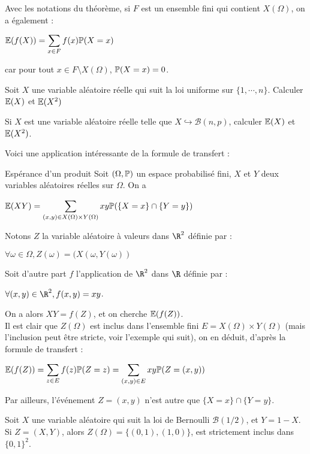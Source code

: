 \documentclass[12pt,a4paper]{report}
\begin{document}
\begin{remarque}{}
Avec les notations du théorème, si $F$ est un ensemble fini qui contient $X(\Omega)$, on a également :
\begin{center}
$\mathbb{E}(f(X)) = \displaystyle \sum_{x \in F} f(x) \mathbb{P}(X=x)$
\end{center}
car pour tout $x \in F \setminus X(\Omega)$, $\mathbb{P}(X=x) = 0$.
\end{remarque}

\begin{exemple}[Exercice 13]{}
Soit $X$ une variable aléatoire réelle qui suit la loi uniforme sur $\{1,\cdots,n\}$. Calculer $\mathbb{E}(X)$ et $\mathbb{E}(X^2)$
\end{exemple}

\begin{exemple}[Exercice 14]{}
Si $X$ est une variable aléatoire réelle telle que $X \hookrightarrow \mathcal{B}(n,p)$, calculer $\mathbb{E}(X)$ et $\mathbb{E}(X^2)$.
\end{exemple}

Voici une application intéressante de la formule de transfert :
\begin{proposition}{Espérance d'un produit}{}
Soit $(\Omega, \mathbb{P})$ un espace probabilisé fini, $X$ et $Y$ deux variables aléatoires réelles sur $\Omega$. On a
\begin{center}
$\mathbb{E}(XY) = \displaystyle \sum_{(x,y) \in X(\Omega) \times Y(\Omega)} xy \mathbb{P}(\{X = x\} \cap \{Y = y\})$
\end{center}
\end{proposition}

\begin{demo}{}
Notons $Z$ la variable aléatoire à valeurs dans $\R^2$ définie par :
\begin{center}
$\forall \omega \in \Omega, Z(\omega) = (X(\omega,Y(\omega))$
\end{center}

Soit d'autre part $f$ l'application de $\R^2$ dans $\R$ définie par :
\begin{center}
$\forall (x,y) \in \R^2, f(x,y) = xy$.
\end{center}

On a alors $XY = f(Z)$, et on cherche $\mathbb{E}(f(Z))$. \\

Il est clair que $Z(\Omega)$ est inclus dans l'ensemble fini $E = X(\Omega) \times Y(\Omega)$ (mais l'inclusion peut être stricte, voir l'exemple qui suit), on en déduit, d'après la formule de transfert : 
\begin{center}
$\mathbb{E}(f(Z)) = \displaystyle \sum_{z \in E} f(z) \mathbb{P}(Z=z) = \sum_{(x,y) \in E} xy \mathbb{P}(Z=(x,y))$
\end{center}

Par ailleurs, l'événement $Z=(x,y)$ n'est autre que $\{X = x\} \cap \{Y = y\}$.
\end{demo}

\begin{exemple}{}
Soit $X$ une variable aléatoire qui suit la loi de Bernoulli $\mathcal{B}(1/2)$, et $Y = 1-X$. \\

Si $Z = (X,Y)$, alors $Z(\Omega) = \{(0,1),(1,0)\}$, est strictement inclus dans $\{0,1\}^2$.
\end{exemple}

	
\end{document}
